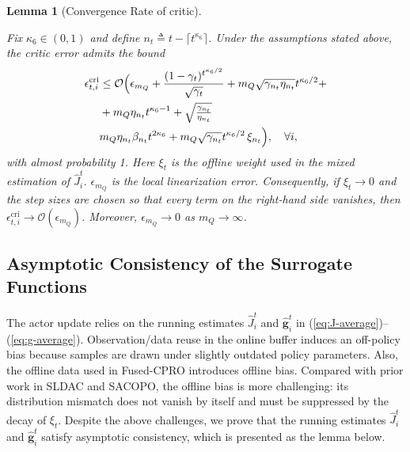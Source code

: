 \documentclass{IEEEtran}
\newtheorem{lemma}{Lemma}
\begin{document}
\begin{lemma}[Convergence Rate of critic]~

\label{lemma-convergence-rate-critic}

Fix $\kappa_{6}\in(0,1)$ and define $n_{t}\triangleq t-\lceil t^{\kappa_{6}}\rceil$. Under the assumptions stated above, the critic error admits the bound
\begin{align}
\epsilon_{t,i}^{\mathrm{cri}} & \le\mathcal{O}\Bigl(\epsilon_{m_{Q}}+\frac{(1-\gamma_{t})^{t^{\kappa_{6}/2}}}{\sqrt{\gamma_{t}}}+m_{Q}\sqrt{\gamma_{n_{t}}\eta_{n_{t}}}t^{\kappa_{6}/2}+\nonumber \\
& +m_{Q}\eta_{n_{t}}t^{\kappa_{6}-1}+\sqrt{\tfrac{\gamma_{n_{t}}}{\eta_{n_{t}}}}\nonumber \\ & m_{Q}\eta_{n_{t}}\beta_{n_{t}}t^{2\kappa_{6}}+m_{Q}\sqrt{\gamma_{n_{t}}}t^{\kappa_{6}/2}\,\xi_{n_{t}}\Bigr),\quad\forall i,
\end{align}
with almost probability 1. Here $\xi_{t}$ is the offline weight used in the mixed estimation of $\hat{J}_{i}^{t}$. $\epsilon_{m_{Q}}$ is the local linearization error. Consequently, if $\xi_{t}\to0$ and the step sizes are chosen so that every term on the right-hand side vanishes, then $\epsilon_{t,i}^{\mathrm{cri}}\to\mathcal{O}(\epsilon_{m_{Q}})$. Moreover, $\epsilon_{m_{Q}}\to0$ as $m_{Q}\to\infty$.

\end{lemma}

\subsection{Asymptotic Consistency of the Surrogate Functions}
The actor update relies on the running estimates $\hat{J}_{i}^{t}$ and $\hat{\boldsymbol{g}}_{i}^{t}$ in (\ref{eq:J-average})--(\ref{eq:g-average}). Observation/data reuse in the online buffer induces an off-policy bias because samples are drawn under slightly outdated policy parameters. Also, the offline data used in Fused-CPRO introduces offline bias. Compared with prior work in SLDAC and SACOPO, the offline bias is more challenging: its distribution mismatch does not vanish by itself and must be suppressed by the decay of $\xi_{t}$. Despite the above challenges, we prove that the running estimates $\hat{J}_{i}^{t}$ and $\hat{\boldsymbol{g}}_{i}^{t}$ satisfy asymptotic consistency, which is presented as the lemma below.
\end{document}
